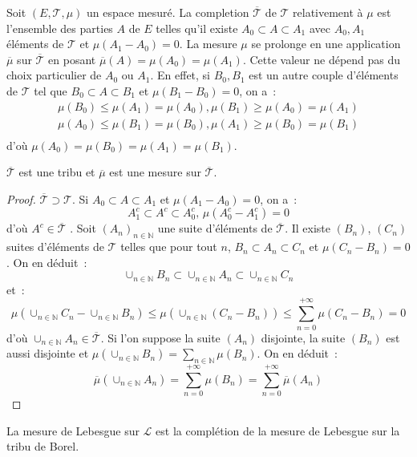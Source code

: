 Soit $(E, \mathcal{T}, \mu)$ un espace mesuré. La completion
$\overline{\mathcal{T}}$ de
$\mathcal{T}$ relativement à $\mu$ est l'ensemble des parties $A$ de
$E$ telles qu'il existe $A_0 \subset A \subset A_1$ avec $A_0, A_1$
éléments de $\mathcal{T}$ et $\mu(A_1-A_0) = 0$. La mesure $\mu$ se
prolonge en une application $\overline{\mu}$ sur $\overline{\mathcal{T}}$
en posant $\overline{\mu}(A) =  \mu(A_0) = \mu(A_1)$. Cette valeur ne
dépend pas du choix particulier de $A_0$ ou $A_1$. En effet, si $B_0,
B_1$ est un autre couple d'éléments de $\mathcal{T}$ tel que $B_0 \subset A
\subset B_1$ et $\mu(B_1-B_0) = 0$, on a~: 
\[
\begin{array}{c}
\mu(B_0) \leq \mu(A_1) = \mu(A_0)  , \mu(B_1) \geq \mu(A_0) =
\mu(A_1) \\
\mu(A_0) \leq \mu(B_1) = \mu(B_0)  , \mu(A_1) \geq \mu(B_0) =
\mu(B_1) \\
\end{array}
\]
d'où $\mu(A_0) = \mu(B_0) = \mu(A_1) = \mu(B_1)$.
\begin{prop} $\overline{\mathcal{T}}$ est une tribu et
$\overline{\mu}$ est une mesure sur $\overline{\mathcal{T}}$.
\end{prop}
\begin{proof}
$\overline{\mathcal{T}} \supset \mathcal{T}$.
Si $A_0 \subset A \subset A_1$ et $\mu(A_1-A_0) = 0$, on a~:
\[
A_1^c \subset A^c \subset A_0^c, \, \mu(A_0^c-A_1^c) = 0
\]
d'où $A^c \in \overline{\mathcal{T}}$ . 
Soit $(A_n)_{n \in \mathbb{N}}$ une suite d'éléments de
$\overline{\mathcal{T}}$. Il existe $(B_n)$, $(C_n)$ suites d'éléments de
$\mathcal{T}$ telles que pour tout $n$, $B_n \subset A_n \subset C_n$
et $\mu(C_n - B_n) = 0$. On en déduit~:
\[
\cup_{n \in \mathbb{N}} B_n \subset \cup_{n \in \mathbb{N}} A_n
\subset \cup_{n \in \mathbb{N}} C_n 
\]
et~:
\[
\mu(\cup_{n \in \mathbb{N}} C_n - \cup_{n \in \mathbb{N}} B_n) \leq
\mu(\cup_{n \in \mathbb{N}} (C_n-B_n)) \leq \sum_{n=0}^{+\infty}
\mu(C_n -B_n) = 0
\]
d'où $\cup_{n \in \mathbb{N}} A_n \in \overline{\mathcal{T}}$. 
Si l'on suppose la suite $(A_n)$ disjointe, la suite $(B_n)$ est aussi
disjointe et $\mu(\cup_{n \in \mathbb{N}} B_n) = \sum_{n \in
\mathbb{N}} \mu(B_n)$. On en déduit~:
\[
\overline{\mu}(\cup_{n \in \mathbb{N}} A_n) = \sum_{n=0}^{+\infty} \mu(B_n) = \sum_{n=0}^{+\infty} \overline{\mu}(A_n)
\]
\end{proof}
\begin{prop}
La mesure de Lebesgue sur $\mathcal{L}$ est la complétion de la mesure de Lebesgue sur
la tribu de Borel.
\end{prop}

